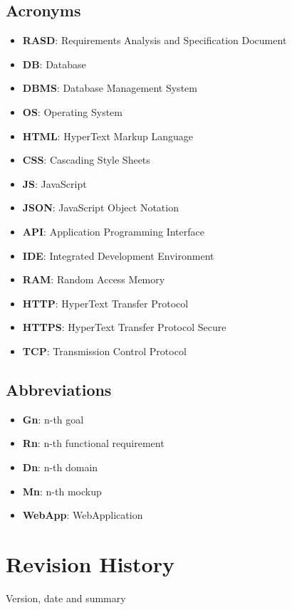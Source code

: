\documentclass[numbers=noenddot, 12pt, a4paper, oneside]{scrbook}
\begin{document}
\subsection*{Acronyms}

\begin{itemize}
	\item \textbf{RASD}: Requirements Analysis and Specification Document
	\item \textbf{DB}: Database
	\item \textbf{DBMS}: Database Management System
	\item \textbf{OS}: Operating System 
	\item \textbf{HTML}: HyperText Markup Language
	\item \textbf{CSS}: Cascading Style Sheets
	\item \textbf{JS}: JavaScript
	\item \textbf{JSON}: JavaScript Object Notation
	\item \textbf{API}: Application Programming Interface
	\item \textbf{IDE}: Integrated Development Environment
	\item \textbf{RAM}: Random Access Memory
	\item \textbf{HTTP}: HyperText Transfer Protocol
	\item \textbf{HTTPS}: HyperText Transfer Protocol Secure
	\item \textbf{TCP}: Transmission Control Protocol
	
\end{itemize}

\subsection*{Abbreviations}
\begin{itemize}
	\item \textbf{Gn}: n-th goal
	\item \textbf{Rn}: n-th functional requirement
	\item \textbf{Dn}: n-th domain
	\item \textbf{Mn}: n-th mockup
	\item \textbf{WebApp}: WebApplication 
\end{itemize}


\section{Revision History}

Version, date and summary\\
\end{document}
